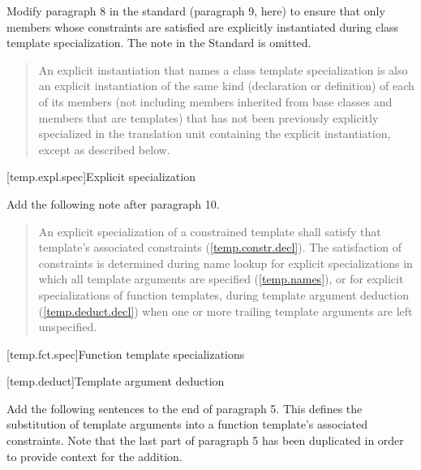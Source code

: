 Modify paragraph 8 in the \Cpp standard (paragraph 9, here) to ensure that 
only members whose constraints are satisfied are explicitly instantiated 
during class template specialization. The note in the \Cpp Standard is omitted.

\begin{quote}
\setcounter{Paras}{8}
\pnum
An explicit instantiation that names a class template specialization is 
also an explicit instantiation of the same kind (declaration or 
definition) of each of its members (not including members inherited from 
base classes and members that are templates) that has not been previously 
explicitly specialized in the translation unit containing the explicit 
instantiation, 
except as described below.
\end{quote}

[temp.expl.spec]{Explicit specialization}

Add the following note after paragraph 10.

\begin{quote}
\setcounter{Paras}{10}
\begin{addedblock}
\pnum
\enternote
An explicit specialization of a constrained template shall satisfy that
template's associated constraints (\ref{temp.constr.decl}). The satisfaction
of constraints is determined during name lookup for explicit specializations
in which all template arguments are specified (\ref{temp.names}), or for
explicit specializations of function templates, during template argument 
deduction (\ref{temp.deduct.decl}) when one or more trailing template 
arguments are left unspecified.
\exitnote
\end{addedblock}
\end{quote}


[temp.fct.spec]{Function template specializations}

\setcounter{subsection}{1}
[temp.deduct]{Template argument deduction}

Add the following sentences to the end of paragraph 5. This defines
the substitution of template arguments into a function template's
associated constraints. Note that the last part of paragraph 5
has been duplicated in order to provide context for the addition.

